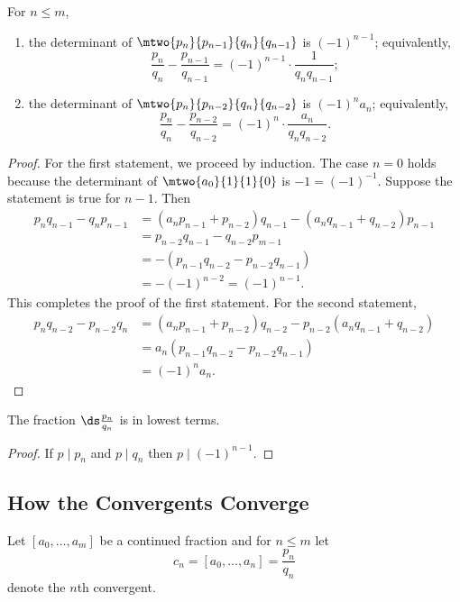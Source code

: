 \documentclass[11pt]{report}
\begin{document}
\begin{proposition}\label{prop:dets}
  For $n\leq m$,
  \begin{enumerate}
    \item
          the determinant of $\mtwo{p_n}{p_{n-1}}{q_n}{q_{n-1}}$ is
          $(-1)^{n-1}$; equivalently,
          $$\frac{p_n}{q_n} - \frac{p_{n-1}}{q_{n-1}} =
            (-1)^{n-1}\cdot\frac{1}{q_n q_{n-1}};$$
    \item
          the determinant of $\mtwo{p_n}{p_{n-2}}{q_n}{q_{n-2}}$ is
          $(-1)^{n}a_n$; equivalently,
          $$\frac{p_n}{q_n} - \frac{p_{n-2}}{q_{n-2}} =
            (-1)^{n}\cdot\frac{a_n}{q_n q_{n-2}}.$$
  \end{enumerate}
\end{proposition}
\begin{proof}
  For the first statement, we proceed by induction.  The case $n=0$
  holds because the determinant of $\mtwo{a_0}{1}{1}{0}$ is $-1=(-1)^{-1}$.
  Suppose the statement is true for $n-1$.  Then
  \begin{align*}
    p_{n}q_{n-1} - q_n p_{n-1} & =
    (a_n p_{n-1} + p_{n-2}) q_{n-1} - (a_n q_{n-1} + q_{n-2}) p_{n-1} \\
                               & = p_{n-2}q_{n-1} - q_{n-2} p_{m-1}   \\
                               & =
    -(p_{n-1}q_{n-2} - p_{n-2} q_{n-1})                               \\
                               & = -(-1)^{n-2} = (-1)^{n-1}.
  \end{align*}
  This completes the proof of the first statement.  For the second statement,
  \begin{align*}
    p_n q_{n-2} - p_{n-2} q_n & =
    (a_n p_{n-1} + p_{n-2})q_{n-2} - p_{n-2}(a_n q_{n-1} + q_{n-2})    \\
                              & = a_n(p_{n-1}q_{n-2} - p_{n-2}q_{n-1}) \\
                              & = (-1)^n a_n.
  \end{align*}
\end{proof}


\begin{corollary}
  The fraction $\ds \frac{p_n}{q_n}$ is in lowest terms.
\end{corollary}
\begin{proof}
  If $p\mid p_n$ and $p\mid q_n$ then $p\mid (-1)^{n-1}$.
\end{proof}

\subsection{How the Convergents Converge}
Let $[a_0,\ldots, a_m]$ be a continued fraction and for
$n\leq m$ let
$$
  c_n = [a_0, \ldots, a_n] = \frac{p_n}{q_n}
$$
denote the $n$th convergent.
\end{document}
